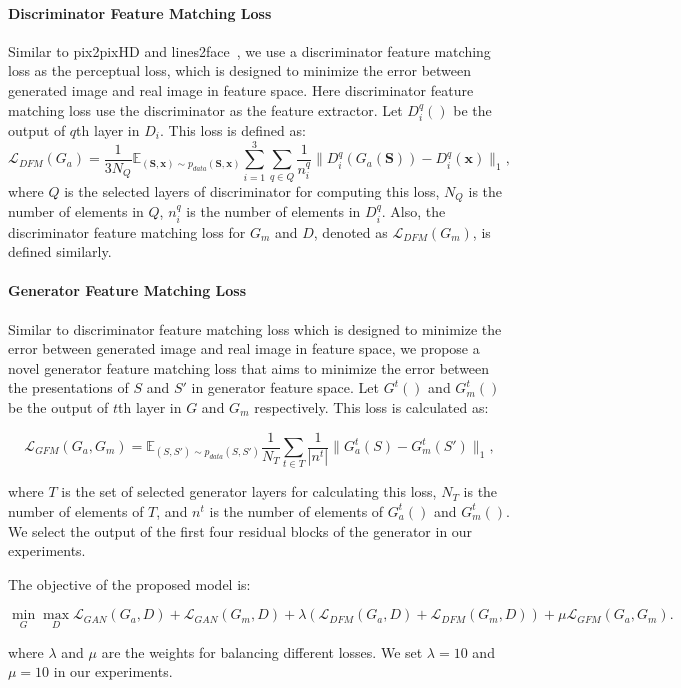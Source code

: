 \paragraph{Discriminator Feature Matching Loss} Similar to pix2pixHD\cite{pix2pixHD} and lines2face~\cite{Lines2Face}, we use a discriminator feature matching loss as the perceptual loss, which is designed to minimize the error between generated image and real image in feature space. Here discriminator feature matching loss use the discriminator as the feature extractor. Let $D^q_i()$ be the output of $q$th layer in $D_i$. This loss is defined as:
\begin{equation}
\label{eqn:feature_matching_loss}
\mathcal{L}_{DFM}(G_a)=\frac{1}{3N_Q}\mathbb{E}_{(\bm{S},\bm{x})\sim p_{data}(\bm{S},\bm{x})}\sum_{i=1}^{3}\sum_{q\in Q} \frac{1}{n_i^q} \|D^q_i(G_a(\bm{S}))-D^q_i(\bm{x})\|_1 ,
\end{equation}
where $Q$ is the selected layers of discriminator for computing this loss, $N_Q$ is the number of elements in $Q$, $n^q_i$ is the number of elements in $D^q_i$.
Also, the discriminator feature matching loss for $G_m$ and $D$, denoted as $\mathcal{L}_{DFM}(G_m)$, is defined similarly.

\paragraph{Generator Feature Matching Loss}
Similar to discriminator feature matching loss which is designed to minimize the error between generated image and real image in feature space, we propose a novel generator feature matching loss that aims to minimize the error between the presentations of $S$ and $S'$ in generator feature space. Let $G^t()$ and $G_m^t()$ be the output of $t$th layer in $G$ and $G_m$ respectively. This loss is calculated as:

\begin{equation}
\label{eqn:loss_GFM}
\mathcal{L}_{GFM}(G_a, G_m)=\mathbb{E}_{(S, S')\sim p_{data}(S, S')} \frac{1}{N_T} \sum_{t\in T}  \frac{1}{|n^t|} \|G_a^t(S)-G_m^t(S') \|_1,
\end{equation}

where $T$ is the set of selected generator layers for calculating this loss, $N_T$ is the number of elements of $T$, and $n^t$ is the number of elements of $G_a^t()$ and $G_m^t()$.
We select the output of the first four residual blocks of the generator in our experiments.

%
The objective of the proposed model is:

\begin{equation}
	\label{eqn:new_minmax_game}
	\min_G \max_{D} \mathcal{L}_{GAN}(G_a, D)+ \mathcal{L}_{GAN}(G_m, D)+\lambda (\mathcal{L}_{DFM}(G_a, D) +\mathcal{L}_{DFM}(G_m, D)) +\mu \mathcal{L}_{GFM}(G_a, G_m).
\end{equation}

where $\lambda$ and $\mu$ are the weights for balancing different losses. We set $\lambda=10$ and $\mu=10$ in our experiments.